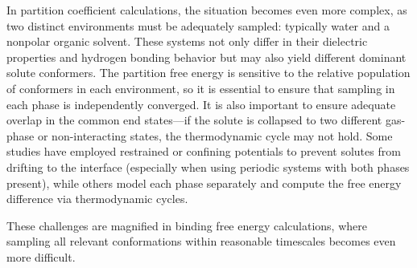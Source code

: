 \documentclass[9pt,bestpractices]{livecoms}
\begin{document}
In partition coefficient calculations, the situation becomes even more complex, as two distinct environments must be adequately sampled: typically water and a nonpolar organic solvent. These systems not only differ in their dielectric properties and hydrogen bonding behavior but may also yield different dominant solute conformers. The partition free energy is sensitive to the relative population of conformers in each environment, so it is essential to ensure that sampling in each phase is independently converged. It is also important to ensure adequate overlap in the common end states—if the solute is collapsed to two different gas-phase or non-interacting states, the thermodynamic cycle may not hold\cite{fan2021sampl7}. Some studies have employed restrained or confining potentials to prevent solutes from drifting to the interface (especially when using periodic systems with both phases present), while others model each phase separately and compute the free energy difference via thermodynamic cycles\cite{turchi2019,bannan2016,petris2021}.

These challenges are magnified in binding free energy calculations, where sampling all relevant conformations within reasonable timescales becomes even more difficult.
\end{document}
